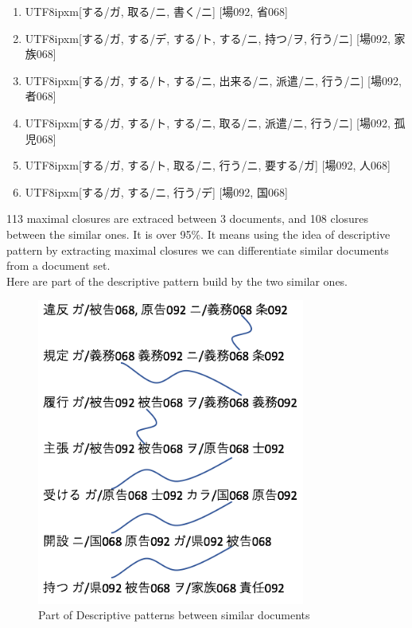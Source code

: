 \begin{enumerate}
\item \begin{CJK}{UTF8}{ipxm}[する/ガ, 取る/ニ, 書く/ニ] [場092, 省068]\end{CJK}
\item \begin{CJK}{UTF8}{ipxm}[する/ガ, する/デ, する/ト, する/ニ, 持つ/ヲ, 行う/ニ] [場092, 家族068]\end{CJK}
\item \begin{CJK}{UTF8}{ipxm}[する/ガ, する/ト, する/ニ, 出来る/ニ, 派遣/ニ, 行う/ニ] [場092, 者068]\end{CJK}
\item \begin{CJK}{UTF8}{ipxm}[する/ガ, する/ト, する/ニ, 取る/ニ, 派遣/ニ, 行う/ニ] [場092, 孤児068]\end{CJK}
\item \begin{CJK}{UTF8}{ipxm}[する/ガ, する/ト, 取る/ニ, 行う/ニ, 要する/ガ] [場092, 人068]\end{CJK}
\item \begin{CJK}{UTF8}{ipxm}[する/ガ, する/ニ, 行う/デ] [場092, 国068]\end{CJK}
\end{enumerate}
113 maximal closures are extraced between 3 documents, and 108 closures between the similar ones. It is over 95\%. It means using the idea of descriptive pattern by extracting maximal closures we can differentiate similar documents from a document set.\\
Here are part of the descriptive pattern build by the two similar ones.
\begin{figure}[!h]
\centering
\includegraphics[width=250pt]{./pictures/0403-3.png}
\caption{Part of Descriptive patterns between similar documents}
\end{figure}
